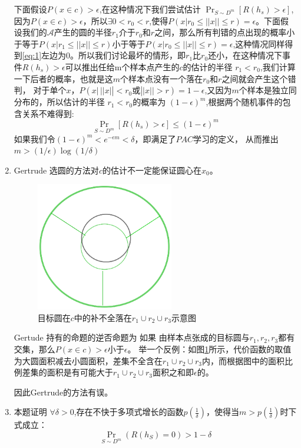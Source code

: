 \documentclass{article}
\begin{document}
\begin{enumerate}
\begin{solution}
下面假设$P(x\in c)>\epsilon$,在这种情况下我们尝试估计
$\Pr_{S\sim D^m} [R(h_s) > \epsilon]$,因为$P(x\in c)>\epsilon$，所以$\exists 0<r_0<r$,使得$P(x | r_0 \leq ||x|| \leq r)=\epsilon$。下面假设我们的$\mathcal{A}$产生的圆的半径$r_1$介于$r_0$和$r$之间，那么所有判错的点出现的概率小于等于$P(x | r_1 \leq ||x|| \leq r)$小于等于$P(x | r_0 \leq ||x|| \leq r)=\epsilon$,这种情况同样得到\eqref{eq:1}左边为0。所以我们讨论最坏的情形，即$r_1$比$r_0$还小，在这种情况下事件$R(h_s) > \epsilon$可以推出任给m个样本点产生的$c$的估计的半径 $r_1<r_0$,我们计算一下后者的概率，也就是这$m$个样本点没有一个落在$r_0$和$r$之间就会产生这个错判，
对于单个$x$，$P(x|\,||x||<r_0 \text{或} ||x||>r)=1-\epsilon$,又因为$m$个样本是独立同分布的，所以估计的半径 $r_1<r_0$的概率为
$(1-\epsilon)^m$,根据两个随机事件的包含关系不难得到:
\begin{equation}
\Pr_{S\sim D^m} [R(h_s) > \epsilon] \leq  (1-\epsilon)^m
\end{equation}
 如果我们令$(1-\epsilon)^m<e^{-\epsilon m}<\delta$，即满足了$PAC$学习的定义，
从而推出$m>(1/\epsilon)\log(1/\delta)$
\end{solution}
\item
Gertrude 选圆的方法对$c$的估计不一定能保证圆心在$x_0$。
\begin{figure}[!ht]
\centering
\includegraphics[width=6cm]{P2.eps}
\caption{目标圆在$c$中的补不全落在$r_1\cup r_2 \cup r_3$示意图}\label{fig:1}
\end{figure}
Gertude 持有的命题的逆否命题为
如果 由样本点张成的目标圆与$r_1,r_2,r_3$都有交集，那么$P(x\in c)>\epsilon$小于$\epsilon$。
举一个反例：如图\ref{fig:1}所示，代价函数的取值为大圆面积减去小圆面积，差集不全含在$r_1\cup r_2 \cup r_3$内，而根据图中的面积比例差集的面积是有可能大于$r_1\cup r_2 \cup r_3$面积之和即$\epsilon$的。

因此Gertrude的方法有误。

\item
本题证明
$\forall \delta >0$,存在不快于多项式增长的函数$p(\frac{1}{\delta})$，使得当$m>p(\frac{1}{\delta})$时下式成立： 
\begin{equation}\label{eq:3modify}
\Pr_{S\sim D^m}(R(h_S)=0)>1-\delta
\end{equation}


\end{enumerate}
\end{document}
